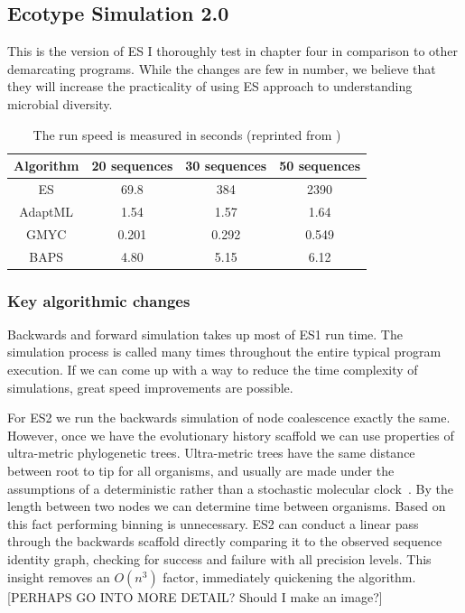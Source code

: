 \subsection*{Ecotype Simulation 2.0}
This is the version of ES I thoroughly test in chapter four in comparison to other demarcating programs.
While the changes are few in number, we believe that they will increase the practicality of using ES approach to understanding microbial diversity.

\begin{table}
 \begin{tabular}{| c | c | c | c |}
  \hline
  Algorithm & 20 sequences & 30 sequences & 50 sequences \\ \hline
  ES & 69.8 & 384 & 2390 \\
  AdaptML & 1.54 & 1.57 & 1.64 \\
  GMYC & 0.201 & 0.292 & 0.549 \\
  BAPS & 4.80 & 5.15 & 6.12 \\
  \hline
 \end{tabular}
 \caption[ES1 run-time compared to other demarcation programs.]{The run speed is measured in seconds (reprinted from \protect\cite{carlo})}
 \label{tab:ES1speed}
\end{table}

\subsubsection*{Key algorithmic changes}
Backwards and forward simulation takes up most of ES1 run time.
The simulation process is called many times throughout the entire typical program execution.
If we can come up with a way to reduce the time complexity of simulations, great speed improvements are possible.

For ES2 we run the backwards simulation of node coalescence exactly the same.
However, once we have the evolutionary history scaffold we can use properties of ultra-metric phylogenetic trees.
Ultra-metric trees have the same distance between root to tip for all organisms, and usually are made under the assumptions of a deterministic rather than a stochastic molecular clock~\cite{ho2008molecular}.
By the length between two nodes we can determine time between organisms.
Based on this fact performing binning is unnecessary.
ES2 can conduct a linear pass through the backwards scaffold directly comparing it to the observed sequence identity graph, checking for success and failure with all precision levels.
This insight removes an $O(n^3)$ factor, immediately quickening the algorithm. [PERHAPS GO INTO MORE DETAIL? Should I make an image?]

